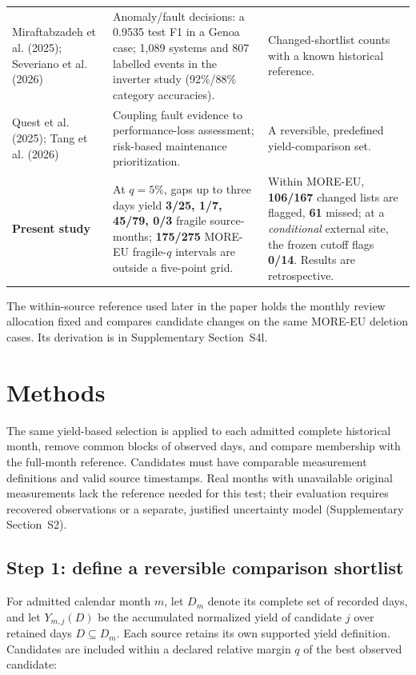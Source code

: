 \documentclass[preprint,12pt]{elsarticle}
\begin{document}
\begin{table}[H]
\begin{tabular}{L{2.65cm}L{4.85cm}L{4.98cm}}
Miraftabzadeh et al. (2025); Severiano et al. (2026) \cite{miraftab2025,severiano2026} & Anomaly/fault decisions: a 0.9535 test F1 in a Genoa case; 1,089 systems and 807 labelled events in the inverter study (92\%/88\% category accuracies). & Changed-shortlist counts with a known historical reference. \\
Quest et al. (2025); Tang et al. (2026) \cite{questfault2025,tang2026} & Coupling fault evidence to performance-loss assessment; risk-based maintenance prioritization. & A reversible, predefined yield-comparison set. \\
\midrule
\textbf{Present study} & At $q=5\%$, gaps up to three days yield \textbf{3/25, 1/7, 45/79, 0/3} fragile source-months; \textbf{175/275} MORE-EU fragile-$q$ intervals are outside a five-point grid. & Within MORE-EU, \textbf{106/167} changed lists are flagged, \textbf{61} missed; at a \emph{conditional} external site, the frozen cutoff flags \textbf{0/14}. Results are retrospective. \\
\bottomrule
\end{tabular}
\end{table}

The within-source reference used later in the paper holds the monthly review allocation fixed and compares candidate changes on the same MORE-EU deletion cases. Its derivation is in Supplementary Section~S4l.

\section{Methods}
The same yield-based selection is applied to each admitted complete historical month, remove common blocks of observed days, and compare membership with the full-month reference. Candidates must have comparable measurement definitions and valid source timestamps. Real months with unavailable original measurements lack the reference needed for this test; their evaluation requires recovered observations or a separate, justified uncertainty model (Supplementary Section~S2).

\subsection{Step 1: define a reversible comparison shortlist}
For admitted calendar month $m$, let $D_m$ denote its complete set of recorded days, and let $Y_{m,j}(D)$ be the accumulated normalized yield of candidate $j$ over retained days $D\subseteq D_m$. Each source retains its own supported yield definition. Candidates are included within a declared relative margin $q$ of the best observed candidate:
\end{document}
